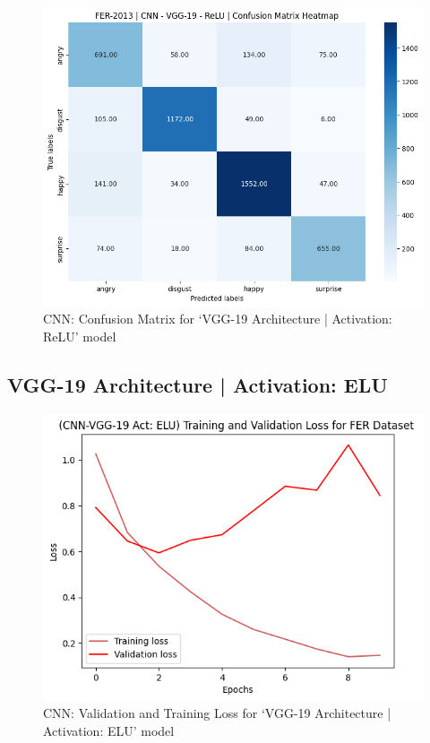 \documentclass[conference]{IEEEtran}
\begin{document}
        \begin{figure}[h]
          \centering
          \includegraphics[width=\columnwidth]{Figures/FER-2013_VGG19-ReLU_CM.png}
          \caption{CNN: Confusion Matrix for `VGG-19 Architecture | Activation: ReLU' model}
          \label{fig:cnnVGG19ReLUConfusionMatrix}
        \end{figure}

      \subsection{VGG-19 Architecture | Activation: ELU}
        \begin{figure}[h]
          \centering
          \includegraphics[width=\columnwidth]{Figures/FER-2013_VGG19-ELU_TVL.png}
          \caption{CNN: Validation and Training Loss for `VGG-19 Architecture | Activation: ELU' model}
          \label{fig:cnnVGG19ELUTVL}
        \end{figure}
\end{document}

